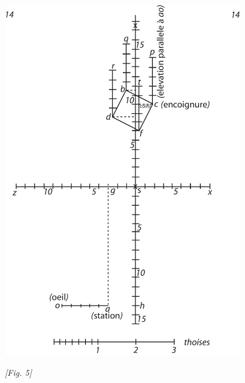 \begin{center}
\includegraphics[width=0.78\textwidth]{images/T14-Desargues}
\\\rule[-4mm]{0mm}{10mm}\textit{[Fig. 5]}
\end{center}